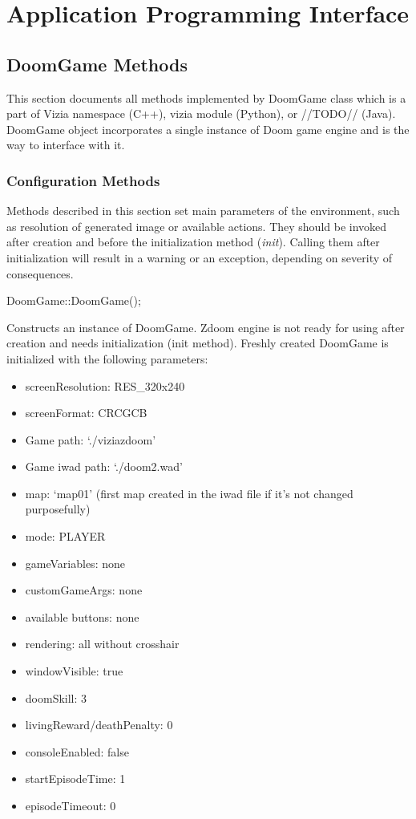 \chapter{Application Programming Interface}\label{ch:api}
\section{DoomGame Methods}\label{sec:methods}
	This section documents all methods implemented by DoomGame class which is a part of Vizia namespace (C++), vizia module (Python), or //TODO// (Java). DoomGame object incorporates a single instance of Doom game engine and is the way to interface with it.
	\subsection{Configuration Methods}\label{subsec:config_methods}
	Methods described in this section set main parameters of the environment, such as resolution of generated image or available actions. They should be invoked after creation and before the initialization method (\emph{init}). Calling them after initialization will result in a warning or an exception, depending on severity of consequences. 
	\vspace{20pt}

\begin{clinee}
DoomGame::DoomGame();
\end{clinee}

Constructs an instance of DoomGame. Zdoom engine is not ready for using after creation and needs initialization (init method). Freshly created DoomGame is initialized with the following parameters:
	\begin{itemize}
		\item screenResolution: RES\_320x240
		\item screenFormat: CRCGCB
		\item Game path: `./viziazdoom'
		\item Game iwad path: `./doom2.wad'
		\item map: `map01' (first map created in the iwad file if it's not changed purposefully)
		\item mode: PLAYER
		\item gameVariables: none
		\item customGameArgs: none
		\item available buttons: none
		\item rendering: all without crosshair
		\item windowVisible: true 
		\item doomSkill: 3
		\item livingReward/deathPenalty: 0
		\item consoleEnabled: false
		\item startEpisodeTime: 1
		\item episodeTimeout: 0
	\end{itemize}

